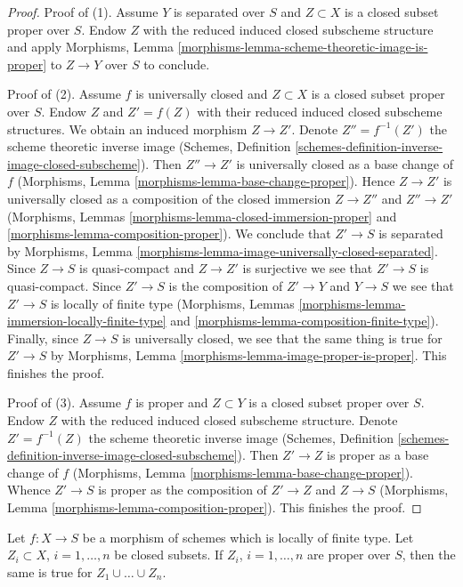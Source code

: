 \begin{proof}
Proof of (1). Assume $Y$ is separated over $S$ and $Z \subset X$
is a closed subset proper over $S$. Endow $Z$ with the reduced induced
closed subscheme structure and apply
Morphisms, Lemma \ref{morphisms-lemma-scheme-theoretic-image-is-proper}
to $Z \to Y$ over $S$ to conclude.

\medskip\noindent
Proof of (2). Assume $f$ is universally closed and $Z \subset X$ is a
closed subset proper over $S$. Endow $Z$ and $Z' = f(Z)$ with their reduced
induced closed subscheme structures. We obtain an induced
morphism $Z \to Z'$.
Denote $Z'' = f^{-1}(Z')$ the scheme theoretic inverse image
(Schemes, Definition \ref{schemes-definition-inverse-image-closed-subscheme}).
Then $Z'' \to Z'$ is universally closed as a base change of $f$
(Morphisms, Lemma \ref{morphisms-lemma-base-change-proper}).
Hence $Z \to Z'$ is universally closed as a composition of
the closed immersion $Z \to Z''$ and $Z'' \to Z'$
(Morphisms, Lemmas
\ref{morphisms-lemma-closed-immersion-proper} and
\ref{morphisms-lemma-composition-proper}).
We conclude that $Z' \to S$ is separated by
Morphisms, Lemma \ref{morphisms-lemma-image-universally-closed-separated}.
Since $Z \to S$ is quasi-compact and $Z \to Z'$ is surjective
we see that $Z' \to S$ is quasi-compact.
Since $Z' \to S$ is the composition of $Z' \to Y$ and $Y \to S$
we see that $Z' \to S$ is locally of finite type
(Morphisms, Lemmas \ref{morphisms-lemma-immersion-locally-finite-type} and
\ref{morphisms-lemma-composition-finite-type}).
Finally, since $Z \to S$ is universally closed, we see that
the same thing is true for $Z' \to S$ by
Morphisms, Lemma \ref{morphisms-lemma-image-proper-is-proper}.
This finishes the proof.

\medskip\noindent
Proof of (3). Assume $f$ is proper and $Z \subset Y$ is a closed subset
proper over $S$. Endow $Z$ with the reduced induced closed subscheme
structure. Denote $Z' = f^{-1}(Z)$ the scheme theoretic inverse image
(Schemes, Definition \ref{schemes-definition-inverse-image-closed-subscheme}).
Then $Z' \to Z$ is proper as a base change of $f$
(Morphisms, Lemma \ref{morphisms-lemma-base-change-proper}).
Whence $Z' \to S$ is proper as the composition of $Z' \to Z$
and $Z \to S$
(Morphisms, Lemma \ref{morphisms-lemma-composition-proper}).
This finishes the proof.
\end{proof}

\begin{lemma}
\label{lemma-union-closed-proper-over-base}
Let $f : X \to S$ be a morphism of schemes which is locally of finite type.
Let $Z_i \subset X$, $i = 1, \ldots, n$ be closed subsets.
If $Z_i$, $i = 1, \ldots, n$ are proper over $S$, then the same is
true for $Z_1 \cup \ldots \cup Z_n$.
\end{lemma}

